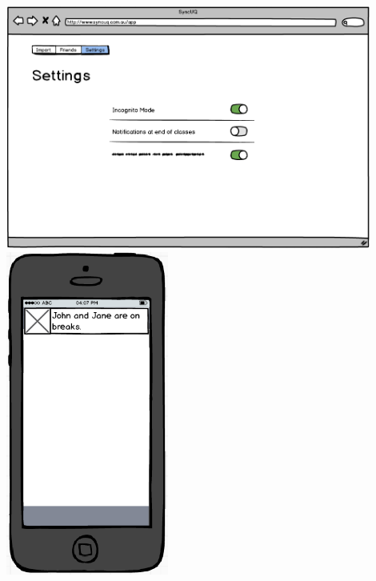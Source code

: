 \documentclass[11pt,a4paper]{report}
\begin{document}
\medskip
\centering
\includegraphics[width=0.9\textwidth]{Settings.png}
\medskip
\centering
\includegraphics[width=0.4\textwidth]{Mobile.png}
\end{document}
